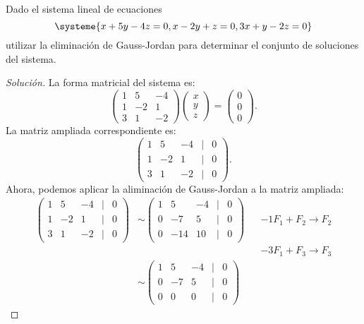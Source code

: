 \documentclass[a4,11pt]{aleph-notas}
\begin{document}
\begin{ejer}
    Dado el sistema lineal de ecuaciones 
    \[
    \systeme{x+5y-4z=0, x-2y+z=0, 3x+y-2z=0}
    \]
    utilizar la eliminación de Gauss-Jordan para determinar el conjunto de soluciones del sistema.
\end{ejer}

\begin{proof}[Solución]\hspace{0pt}
    La forma matricial del sistema es:
    \[
    \begin{pmatrix}
    1&5&-4\\1&-2&1\\3&1&-2
    \end{pmatrix}
    \begin{pmatrix}
    x \\ y\\ z
    \end{pmatrix}
    =
    \begin{pmatrix}
    0 \\ 0\\ 0
    \end{pmatrix}.
    \]
    La matriz ampliada correspondiente es:
    \[
    \begin{pmatrix}
    1&5&-4&|&0\\
    1&-2&1&|&0\\
    3&1&-2&|&0
    \end{pmatrix}.
    \]
    Ahora, podemos aplicar la aliminación de Gauss-Jordan a la matriz ampliada:
    \begin{align*}
      \begin{pmatrix}
        1&5&-4&|&0\\
        1&-2&1&|&0\\
        3&1&-2&|&0
      \end{pmatrix}
      & \sim 
      \begin{pmatrix}
        1&5&-4&|&0\\
        0&-7&5&|&0\\
        0&-14&10&|&0
      \end{pmatrix}
      && -1F_1+F_2\to F_2\\
      &&&-3F_1+F_3\to F_3\\
      & \sim 
      \begin{pmatrix}
        1&5&-4&|&0\\
        0&-7&5&|&0\\
        0&0&0&|&0
      \end{pmatrix}

\end{align*}
\end{proof}
\end{document}
